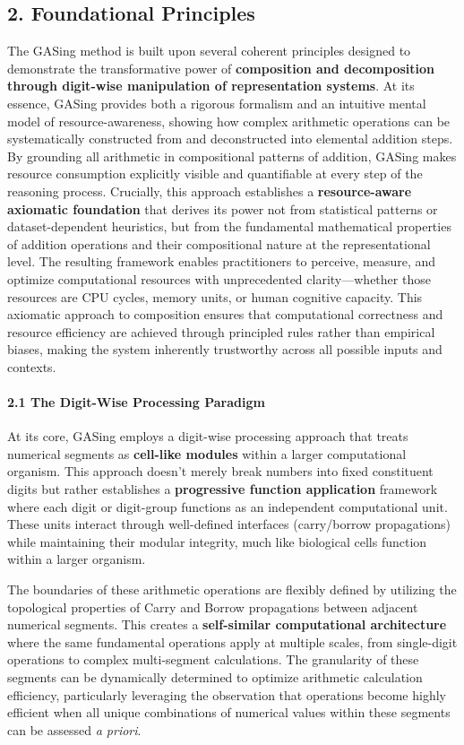 \subsection{2. Foundational Principles}
The GASing method is built upon several coherent principles designed to demonstrate the transformative power of \textbf{composition and decomposition through digit-wise manipulation of representation systems}. At its essence, GASing provides both a rigorous formalism and an intuitive mental model of resource-awareness, showing how complex arithmetic operations can be systematically constructed from and deconstructed into elemental addition steps. By grounding all arithmetic in compositional patterns of addition, GASing makes resource consumption explicitly visible and quantifiable at every step of the reasoning process. Crucially, this approach establishes a \textbf{resource-aware axiomatic foundation} that derives its power not from statistical patterns or dataset-dependent heuristics, but from the fundamental mathematical properties of addition operations and their compositional nature at the representational level. The resulting framework enables practitioners to perceive, measure, and optimize computational resources with unprecedented clarity—whether those resources are CPU cycles, memory units, or human cognitive capacity. This axiomatic approach to composition ensures that computational correctness and resource efficiency are achieved through principled rules rather than empirical biases, making the system inherently trustworthy across all possible inputs and contexts.

\paragraph{2.1 The Digit-Wise Processing Paradigm}
At its core, GASing employs a digit-wise processing approach that treats numerical segments as \textbf{cell-like modules} within a larger computational organism. This approach doesn't merely break numbers into fixed constituent digits but rather establishes a \textbf{progressive function application} framework where each digit or digit-group functions as an independent computational unit. These units interact through well-defined interfaces (carry/borrow propagations) while maintaining their modular integrity, much like biological cells function within a larger organism.

The boundaries of these arithmetic operations are flexibly defined by utilizing the topological properties of Carry and Borrow propagations between adjacent numerical segments. This creates a \textbf{self-similar computational architecture} where the same fundamental operations apply at multiple scales, from single-digit operations to complex multi-segment calculations. The granularity of these segments can be dynamically determined to optimize arithmetic calculation efficiency, particularly leveraging the observation that operations become highly efficient when all unique combinations of numerical values within these segments can be assessed \emph{a priori}. 

